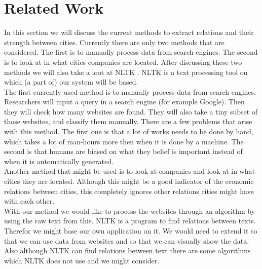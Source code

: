 \section{Related Work}
In this section we will discuss the current methods to extract relations and their strength between cities. Currently there are only two methods that are considered. The first is to manually process data from search engines. The second is to look at in what cities companies are located. After discussing these two methods we will also take a loot at NLTK \cite{nlkt_stemming}. NLTK is  a text processing tool on which (a part of) our system will be based.\\

The first currently used method is to manually process data from search engines. Researchers will input a query in a search engine (for example Google). Then they will check how many websites are found. They will also take a tiny subset of those websites, and classify them manually. There are a few problems that arise with this method. The first one is that a lot of works needs to be done by hand, which takes a lot of man-hours more then when it is done by a machine. The second is that humans are biased on what they belief is important instead of when it is automatically generated. \\

Another method that might be used is to look at companies and look at in what cities they are located. Although this might be a good indicator of the economic relations between cities, this completely ignores other relations cities might have with each other.\\

With our method we would like to process the websites through an algorithm by using the raw text from this. NLTK is a program to find relations between texts. Therefor we might base our own application on it. We would need to extend it so that we can use data from websites and so that we can visually show the data. Also although NLTK can find relations between text there are some algorithms which NLTK does not use and we might consider.

